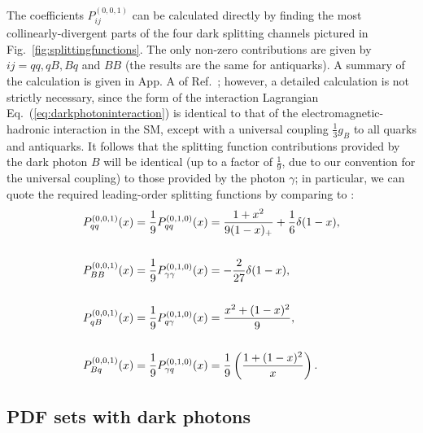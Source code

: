 \documentclass[withindex,glossary]{cam-thesis}
\begin{document}
%
The coefficients $P_{ij}^{(0,0,1)}$ can be calculated directly by
finding the most collinearly-divergent parts of the four dark
splitting channels pictured in Fig.~\ref{fig:splittingfunctions}. The only non-zero contributions are given by $ij=qq, qB, Bq$ and $BB$ (the results are the same for antiquarks).
A summary of the calculation is given in App. A of Ref.~\cite{McCullough:2022hzr}; 
however, a detailed calculation is not strictly necessary, since the form
of the interaction Lagrangian Eq.~(\ref{eq:darkphotoninteraction}) is identical
to that of the electromagnetic-hadronic interaction in the SM,
except with a universal coupling $\frac{1}{3}g_B$ to all quarks and antiquarks.
It follows that the splitting function contributions provided by the
dark photon $B$ will be identical (up to a factor of $\frac{1}{9}$, due to
our convention for the universal coupling) to those provided by the
photon $\gamma$; in particular, we can quote the required leading-order
splitting functions by comparing to \cite{Bertone:2015lqa}:
\begin{align}
\label{eq:splittingfunctions}
P_{qq}^{(0,0,1)}(x) &= \frac{1}{9}P_{qq}^{(0,1,0)}(x) = \frac{1+x^2}{9(1-x)_+} + \frac{1}{6} \delta(1-x), \notag\\\notag\\
 P_{BB}^{(0,0,1)}(x) &= \frac{1}{9} P_{\gamma\gamma}^{(0,1,0)}(x)= -\frac{2}{27}\delta(1-x), \notag\\ \\
P_{qB}^{(0,0,1)}(x) &= \frac{1}{9} P_{q\gamma}^{(0,1,0)}(x) = \frac{x^2 + (1-x)^2}{9},\notag\\\notag\\
 P_{Bq}^{(0,0,1)}(x) &= \frac{1}{9} P_{\gamma q}^{(0,1,0)}(x) = \frac{1}{9} \left( \frac{1 + (1-x)^2}{x} \right). \notag
\end{align}

\subsection{PDF sets with dark photons}
\label{sec:pdf_sets_with_dark_photons}
\end{document}
